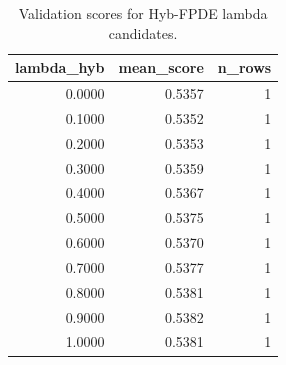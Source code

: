 \begin{table}[t]
\caption{Validation scores for Hyb-FPDE lambda candidates.}
\label{tab:lambda_distribution_computed}
\centering
\begin{tabular}{rrr}
\toprule
lambda\_hyb & mean\_score & n\_rows \\
\midrule
0.0000 & 0.5357 & 1 \\
0.1000 & 0.5352 & 1 \\
0.2000 & 0.5353 & 1 \\
0.3000 & 0.5359 & 1 \\
0.4000 & 0.5367 & 1 \\
0.5000 & 0.5375 & 1 \\
0.6000 & 0.5370 & 1 \\
0.7000 & 0.5377 & 1 \\
0.8000 & 0.5381 & 1 \\
0.9000 & 0.5382 & 1 \\
1.0000 & 0.5381 & 1 \\
\bottomrule
\end{tabular}

\end{table}
